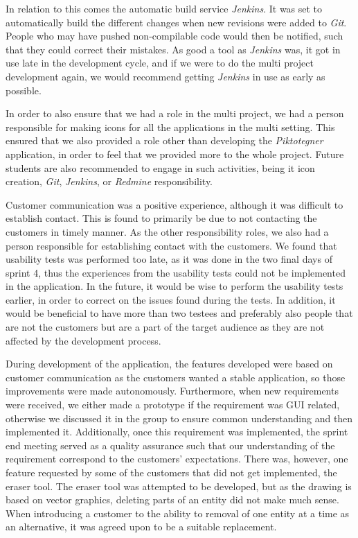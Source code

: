 In relation to this comes the automatic build service \textit{Jenkins}. 
It was set to automatically build the different changes when new revisions were added to \textit{Git}. 
People who may have pushed non-compilable code would then be notified, such that they could correct their mistakes.
As good a tool as \textit{Jenkins} was, it got in use late in the development cycle, and if we were to do the multi project development again, we would recommend getting \textit{Jenkins} in use as early as possible.

In order to also ensure that we had a role in the multi project, we had a person responsible for making icons for all the applications in the multi setting.
This ensured that we also provided a role other than developing the \textit{Piktotegner} application, in order to feel that we provided more to the whole project. 
Future students are also recommended to engage in such activities, being it icon creation, \textit{Git}, \textit{Jenkins}, or \textit{Redmine} responsibility.

Customer communication was a positive experience, although it was difficult to establish contact.
This is found to primarily be due to not contacting the customers in timely manner.
As the other responsibility roles, we also had a person responsible for establishing contact with the customers.
We found that usability tests was performed too late, as it was done in the two final days of sprint 4, thus the experiences from the usability tests could not be implemented in the application.
In the future, it would be wise to perform the usability tests earlier, in order to correct on the issues found during the tests.
In addition, it would be beneficial to have more than two testees and preferably also people that are not the customers but are a part of the target audience as they are not affected by the development process.

During development of the application, the features developed were based on customer communication as the customers wanted a stable application, so those improvements were made autonomously.
Furthermore, when new requirements were received, we either made a prototype if the requirement was GUI related, otherwise we discussed it in the group to ensure common understanding and then implemented it.
Additionally, once this requirement was implemented, the sprint end meeting served as a quality assurance such that our understanding of the requirement correspond to the customers' expectations.
There was, however, one feature requested by some of the customers that did not get implemented, the eraser tool.
The eraser tool was attempted to be developed, but as the drawing is based on vector graphics, deleting parts of an entity did not make much sense. 
When introducing a customer to the ability to removal of one entity at a time as an alternative, it was agreed upon to be a suitable replacement.

